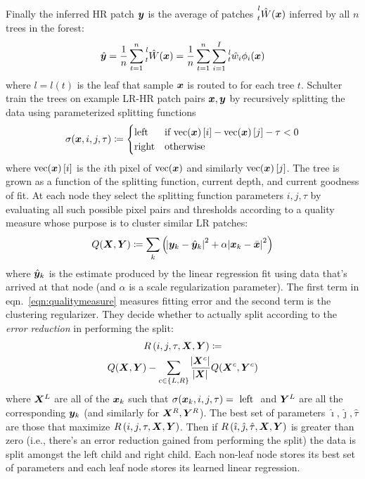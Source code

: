 %
Finally the inferred HR patch \(\bm{y}\) is the average of patches \(\prescript{l}{t}{\hat{W}(\bm{x})}\) inferred by all \(n\) trees in the forest:
\begin{equation}
	\hat{\bm{y}} = \frac{1}{n} \sum_{t=1}^{n} \prescript{l}{t}{\hat{W}(\bm{x})} =  \frac{1}{n} \sum_{t=1}^{n} \sum_{i=1}^I \prescript{l}{t}{\hat{w}_i}\phi_i(\bm{x})
\end{equation}
where \(l = l(t)\) is the leaf that sample \(\bm{x}\) is routed to for each tree \(t\).
%
Schulter \etal~ train the trees on example LR-HR patch pairs \(\bm{x}, \bm{y}\) by recursively splitting the data using parameterized splitting functions
\begin{equation}
	\sigma(\bm{x}, i, j, \tau)\coloneqq {
		\begin{cases}
			\text{left}  & \text{if } \text{vec}(\bm{x})\left[ i \right] - \text{vec}(\bm{x})\left[ j \right] - \tau < 0 \\
			\text{right} & \text{otherwise}
		\end{cases}
	}
\end{equation}
where \(\text{vec}(\bm{x})\left[ i \right]\) is the \(i\)th pixel of \(\text{vec}(\bm{x})\) and similarly \(\text{vec}(\bm{x})\left[ j \right]\).
%
The tree is grown as a function of the splitting function, current depth, and current goodness of fit.
%
At each node they select the splitting function parameters \(i, j, \tau\) by evaluating all such possible pixel pairs and thresholds according to a quality measure whose purpose is to cluster similar LR patches:
\begin{equation}
	Q(\bX, \bY) \coloneqq \sum_k \left( \abs{ \by_k - \hat{\by}_k }^2 + \alpha\abs{ \bx_k - \bar{\bx} }^2 \right)
	\label{eqn:qualitymeasure}
\end{equation}
where \(\hat{\bm{y}}_k\) is the estimate produced by the linear regression fit using data that's arrived at that node (and \(\alpha\) is a scale regularization parameter).
%
The first term in eqn.~\eqref{eqn:qualitymeasure} measures fitting error and the second term is the clustering regularizer.
%
They decide whether to actually split according to the \textit{error reduction} in performing the split:
\begin{multline*}
	R\left(i, j, \tau, \bm{X}, \bm{Y} \right) \coloneqq \\ Q(\bm{X}, \bm{Y}) - \sum_{c\in\left\{L, R\right\}} \frac{\abs{\bm{X}^c}}{\abs{\bm{X}}} Q(\bm{X}^c, \bm{Y}^c)
\end{multline*}
where \(\bm{X}^L\) are all of the \(\bm{x}_k\) such that \(\sigma(\bm{x}_k, i, j, \tau) = \text{ left }\) and \(\bm{Y}^L\) are all the corresponding \(\bm{y}_k\) (and similarly for \(\bm{X}^R, \bm{Y}^R\)).
%
The best set of parameters \(\hat{\imath}, \hat{\jmath}, \hat{\tau}\) are those that maximize \(R\left(i, j, \tau, \bm{X}, \bm{Y} \right)\).
%
Then if \(R\left(\hat{\imath}, \hat{\jmath}, \hat{\tau}, \bm{X}, \bm{Y} \right)\) is greater than zero (i.e., there's an error reduction gained from performing the split) the data is split amongst the left child and right child.
%
Each non-leaf node stores its best set of parameters and each leaf node stores its learned linear regression.